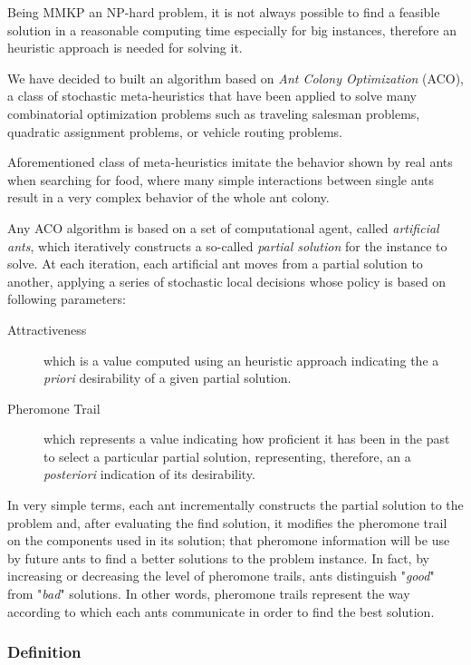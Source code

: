 \documentclass[12pt,a4paper]{report}
\theoremstyle{definition}
\begin{document}
Being MMKP an NP-hard problem, it is not always possible to find a feasible solution in a reasonable computing time especially for big instances, therefore an heuristic approach is needed for solving it. 

We have decided to built an algorithm based on \textit{Ant Colony Optimization} (ACO), a class of stochastic meta-heuristics that have been applied to solve many combinatorial optimization problems such as traveling salesman problems, quadratic assignment problems, or vehicle routing problems. 

Aforementioned class of meta-heuristics imitate the behavior shown by real ants when searching for food, where many simple interactions between single ants result in a very complex behavior of the whole ant colony.

Any ACO algorithm is based on a set of computational agent, called \textit{artificial ants}, which iteratively constructs a so-called  \textit{partial solution} for the instance to solve. At each iteration, each artificial ant moves from a partial solution to another, applying a series of stochastic local decisions whose policy is based on following parameters:

\begin{description}
	\item[Attractiveness] which is a value computed using an heuristic approach indicating the a \textit{priori} desirability of a given partial solution.
	
	\item[Pheromone Trail] which represents a value indicating how proficient it has been in the past to select a particular partial solution, representing, therefore, an a \textit{posteriori} indication of its desirability.
\end{description} 

In very simple terms, each ant incrementally constructs the partial solution to the problem and, after evaluating the find solution, it modifies the pheromone trail on the components used in its solution; that pheromone information will be use by future ants to find a better solutions to the problem instance. In fact, by increasing or decreasing the level of pheromone trails, ants distinguish "\textit{good}" from "\textit{bad}" solutions. In other words, pheromone trails represent the way according to which each ants communicate in order to find the best solution.
 
\subsubsection{Definition}
\end{document}
